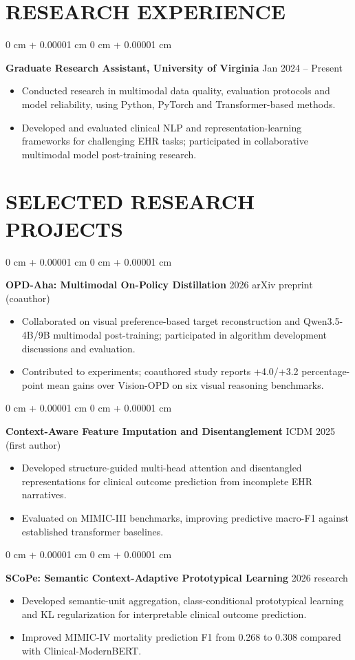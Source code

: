 \documentclass[10pt, letterpaper]{article}
\newenvironment{highlights}{
    \begin{itemize}[
        topsep=0.03 cm,
        parsep=0.03 cm,
        partopsep=0pt,
        itemsep=0pt,
        leftmargin=0 cm + 10pt
    ]
}{
    \end{itemize}
} %
\newenvironment{onecolentry}{
    \begin{adjustwidth}{
        0 cm + 0.00001 cm
    }{
        0 cm + 0.00001 cm
    }
}{
    \end{adjustwidth}
} %
\begin{document}
\section{RESEARCH EXPERIENCE}
\begin{onecolentry}
\textbf{Graduate Research Assistant, University of Virginia} \hfill Jan 2024 -- Present
\begin{highlights}
\item Conducted research in multimodal data quality, evaluation protocols and model reliability, using Python, PyTorch and Transformer-based methods.
\item Developed and evaluated clinical NLP and representation-learning frameworks for challenging EHR tasks; participated in collaborative multimodal model post-training research.
\end{highlights}
\end{onecolentry}
\section{SELECTED RESEARCH PROJECTS}
\begin{onecolentry}
\textbf{OPD-Aha: Multimodal On-Policy Distillation} \hfill 2026 arXiv preprint (coauthor)
\begin{highlights}
\item Collaborated on visual preference-based target reconstruction and Qwen3.5-4B/9B multimodal post-training; participated in algorithm development discussions and evaluation.
\item Contributed to experiments; coauthored study reports +4.0/+3.2 percentage-point mean gains over Vision-OPD on six visual reasoning benchmarks.
\end{highlights}
\end{onecolentry}
\vspace{0.025 cm}
\begin{onecolentry}
\textbf{Context-Aware Feature Imputation and Disentanglement} \hfill ICDM 2025 (first author)
\begin{highlights}
\item Developed structure-guided multi-head attention and disentangled representations for clinical outcome prediction from incomplete EHR narratives.
\item Evaluated on MIMIC-III benchmarks, improving predictive macro-F1 against established transformer baselines.
\end{highlights}
\end{onecolentry}
\vspace{0.025 cm}
\begin{onecolentry}
\textbf{SCoPe: Semantic Context-Adaptive Prototypical Learning} \hfill 2026 research
\begin{highlights}
\item Developed semantic-unit aggregation, class-conditional prototypical learning and KL regularization for interpretable clinical outcome prediction.
\item Improved MIMIC-IV mortality prediction F1 from 0.268 to 0.308 compared with Clinical-ModernBERT.
\end{highlights}
\end{onecolentry}
\vspace{0.025 cm}
\end{document}
